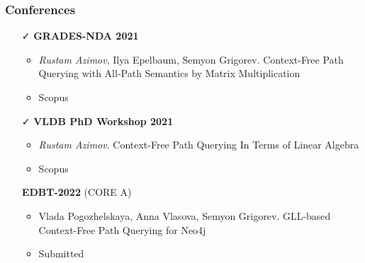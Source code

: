 \documentclass[xcolor=table]{beamer}
\begin{document}
\begin{frame}[fragile]

  \frametitle{Conferences}
      \begin{itemize}

      \item[\faCheck] \textbf{GRADES-NDA 2021}
      \begin{itemize}
        \item \emph{Rustam Azimov}, Ilya Epelbaum, Semyon Grigorev. Context-Free Path Querying with All-Path Semantics by Matrix Multiplication
        \item Scopus
      \end{itemize}

      \item[\faCheck] \textbf{VLDB PhD Workshop 2021}
      \begin{itemize}
         \item \emph{Rustam Azimov}. Context-Free Path Querying In Terms of Linear Algebra
         \item Scopus
      \end{itemize}

      \item[\faHourglassHalf] \textbf{EDBT-2022} (CORE A) 
      \begin{itemize}
        \item Vlada Pogozhelskaya, Anna Vlasova, Semyon Grigorev. GLL-based Context-Free Path Querying for Neo4j
        \item Submitted
      \end{itemize}

\end{itemize}
\end{frame}
\end{document}
